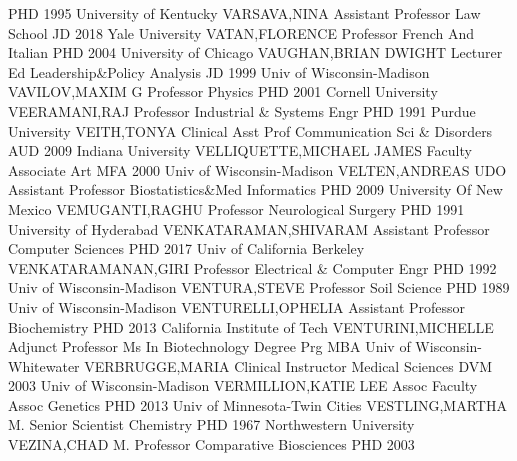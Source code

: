 \documentclass[
]{article}
\begin{document}
\textbar PHD 1995 University of Kentucky \textbar{} 
\textbar VARSAVA,NINA \textbar Assistant Professor \textbar Law School
\textbar JD 2018 Yale University \textbar{} 
\textbar VATAN,FLORENCE \textbar Professor \textbar French And Italian
\textbar PHD 2004 University of Chicago \textbar{} 
\textbar VAUGHAN,BRIAN DWIGHT \textbar Lecturer \textbar Ed
Leadership\&Policy Analysis \textbar JD 1999 Univ of Wisconsin-Madison
\textbar{}  \textbar VAVILOV,MAXIM G \textbar Professor
\textbar Physics \textbar PHD 2001 Cornell University \textbar{}
 \textbar VEERAMANI,RAJ \textbar Professor
\textbar Industrial \& Systems Engr \textbar PHD 1991 Purdue University
\textbar{}  \textbar VEITH,TONYA \textbar Clinical Asst Prof
\textbar Communication Sci \& Disorders \textbar AUD 2009 Indiana
University \textbar{}  \textbar VELLIQUETTE,MICHAEL JAMES
\textbar Faculty Associate \textbar Art \textbar MFA 2000 Univ of
Wisconsin-Madison \textbar{}  \textbar VELTEN,ANDREAS UDO
\textbar Assistant Professor \textbar Biostatistics\&Med Informatics
\textbar PHD 2009 University Of New Mexico \textbar{} 
\textbar VEMUGANTI,RAGHU \textbar Professor \textbar Neurological
Surgery \textbar PHD 1991 University of Hyderabad \textbar{}
 \textbar VENKATARAMAN,SHIVARAM \textbar Assistant Professor
\textbar Computer Sciences \textbar PHD 2017 Univ of California Berkeley
\textbar{}  \textbar VENKATARAMANAN,GIRI \textbar Professor
\textbar Electrical \& Computer Engr \textbar PHD 1992 Univ of
Wisconsin-Madison \textbar{}  \textbar VENTURA,STEVE
\textbar Professor \textbar Soil Science \textbar PHD 1989 Univ of
Wisconsin-Madison \textbar{}  \textbar VENTURELLI,OPHELIA
\textbar Assistant Professor \textbar Biochemistry \textbar PHD 2013
California Institute of Tech \textbar{} 
\textbar VENTURINI,MICHELLE \textbar Adjunct Professor \textbar Ms In
Biotechnology Degree Prg \textbar MBA Univ of Wisconsin-Whitewater
\textbar{}  \textbar VERBRUGGE,MARIA \textbar Clinical
Instructor \textbar Medical Sciences \textbar DVM 2003 Univ of
Wisconsin-Madison \textbar{}  \textbar VERMILLION,KATIE LEE
\textbar Assoc Faculty Assoc \textbar Genetics \textbar PHD 2013 Univ of
Minnesota-Twin Cities \textbar{}  \textbar VESTLING,MARTHA
M. \textbar Senior Scientist \textbar Chemistry \textbar PHD 1967
Northwestern University \textbar{}  \textbar VEZINA,CHAD M.
\textbar Professor \textbar Comparative Biosciences \textbar PHD 2003
\end{document}
